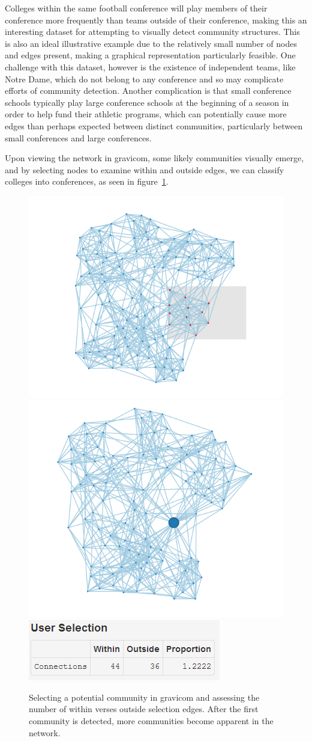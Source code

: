 \documentclass{article}\usepackage[]{graphicx}\usepackage[]{color}
\begin{document}
Colleges within the same football conference will play members of their conference more frequently than teams outside of their conference, making this an interesting dataset for attempting to visually detect community structures. This is also an ideal illustrative example due to the relatively small number of nodes and edges present, making a graphical representation particularly feasible. One challenge with this dataset, however is the existence of independent teams, like Notre Dame, which do not belong to any conference and so may complicate efforts of community detection. Another complication is that small conference schools typically play large conference schools at the beginning of a season in order to help fund their athletic programs, which can potentially cause more edges than perhaps expected between distinct communities, particularly between small conferences and large conferences.

Upon viewing the network in gravicom, some likely communities visually emerge, and by selecting nodes to examine within and outside edges, we can classify colleges into conferences, as seen in figure~\ref{fig:football_2}.

\begin{figure}[H]
\centering
\includegraphics[width=.49\textwidth]{images/football_2.png}
\includegraphics[width=.49\textwidth]{images/football_4.png}
\includegraphics[]{images/football_3.png}
\caption{\label{fig:football_2} Selecting a potential community in gravicom and assessing the number of within verses outside selection edges. After the first community is detected, more communities become apparent in the network.}
\end{figure}
\end{document}
